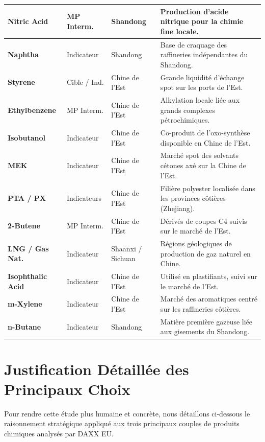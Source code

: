 \documentclass[12pt,a4paper]{article}
\begin{document}
\begin{longtable}{lllp{6.5cm}}
\midrule
\textbf{Nitric Acid} & MP Interm. & Shandong & Production d'acide nitrique pour la chimie fine locale. \\
\midrule
\textbf{Naphtha} & Indicateur & Shandong & Base de craquage des raffineries indépendantes du Shandong. \\
\midrule
\textbf{Styrene} & Cible / Ind. & Chine de l'Est & Grande liquidité d'échange spot sur les ports de l'Est. \\
\addlinespace
\textbf{Ethylbenzene} & MP Interm. & Chine de l'Est & Alkylation locale liée aux grands complexes pétrochimiques. \\
\midrule
\textbf{Isobutanol} & Indicateur & Chine de l'Est & Co-produit de l'oxo-synthèse disponible en Chine de l'Est. \\
\midrule
\textbf{MEK} & Indicateur & Chine de l'Est & Marché spot des solvants cétones axé sur la Chine de l'Est. \\
\midrule
\textbf{PTA / PX} & Indicateurs & Chine de l'Est & Filière polyester localisée dans les provinces côtières (Zhejiang). \\
\midrule
\textbf{2-Butene} & MP Interm. & Chine de l'Est & Dérivés de coupes C4 suivis sur le marché de l'Est. \\
\midrule
\textbf{LNG / Gas Nat.} & Indicateur & Shaanxi / Sichuan & Régions géologiques de production de gaz naturel en Chine. \\
\midrule
\textbf{Isophthalic Acid} & Indicateur & Chine de l'Est & Utilisé en plastifiants, suivi sur le marché de l'Est. \\
\midrule
\textbf{m-Xylene} & Indicateur & Chine de l'Est & Marché des aromatiques centré sur les raffineries côtières. \\
\midrule
\textbf{n-Butane} & Indicateur & Shandong & Matière première gazeuse liée aux gisements du Shandong. \\
\end{longtable}

\newpage
\section{Justification Détaillée des Principaux Choix}

Pour rendre cette étude plus humaine et concrète, nous détaillons ci-dessous le raisonnement stratégique appliqué aux trois principaux couples de produits chimiques analysés par DAXX EU.
\end{document}
